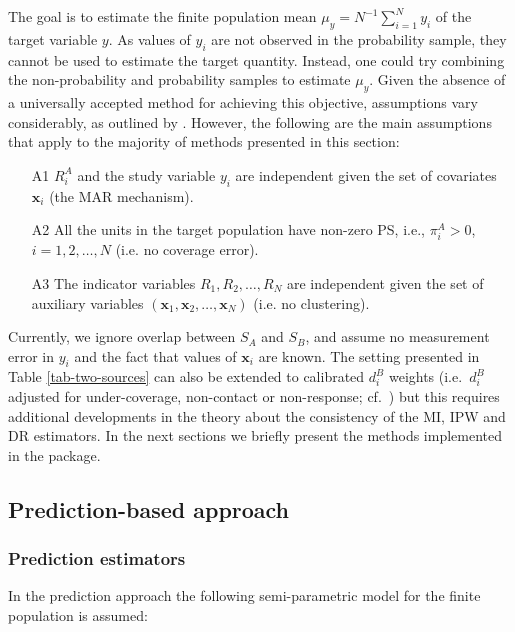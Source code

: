\documentclass[
]{jss}
\begin{document}
The goal is to estimate the finite population mean
\(\mu_y=N^{-1}\sum_{i=1}^{N} y_{i}\) of the target variable \(y\). As
values of \(y_{i}\) are not observed in the probability sample, they
cannot be used to estimate the target quantity. Instead, one could try
combining the non-probability and probability samples to estimate
\(\mu_y\). Given the absence of a universally accepted method for
achieving this objective, assumptions vary considerably, as outlined by
\cite{wu2022statistical}. However, the following are the main
assumptions that apply to the majority of methods presented in this
section:

\begin{itemize}
\item[A1] $R_i^A$ and the study variable $y_i$ are independent given the set of covariates $\boldsymbol{x}_i$ (the MAR mechanism).
\item[A2] All the units in the target population have non-zero PS, i.e., $\pi_i^A>0$, $i=1,2, \ldots, N$ (i.e. no coverage error).
\item[A3] The indicator variables $R_1, R_2, \ldots, R_N$ are independent given the set of auxiliary variables $\left(\boldsymbol{x}_1, \boldsymbol{x}_2, \ldots, \boldsymbol{x}_N\right)$ (i.e. no clustering).
\end{itemize}

Currently, we ignore overlap between \(S_A\) and \(S_B\), and assume no
measurement error in \(y_i\) and the fact that values of
\(\boldsymbol{x}_i\) are known. The setting presented in Table
\ref{tab-two-sources} can also be extended to calibrated \(d_i^B\)
weights (i.e.~\(d_i^B\) adjusted for under-coverage, non-contact or
non-response; cf.~\cite{sarndal2005estimation}) but this requires
additional developments in the theory about the consistency of the MI,
IPW and DR estimators. In the next sections we briefly present the
methods implemented in the package.

\subsection{Prediction-based approach}\label{sec-prediction}

\subsubsection{Prediction estimators}\label{prediction-estimators}

In the prediction approach the following semi-parametric model for the
finite population is assumed:
\end{document}
